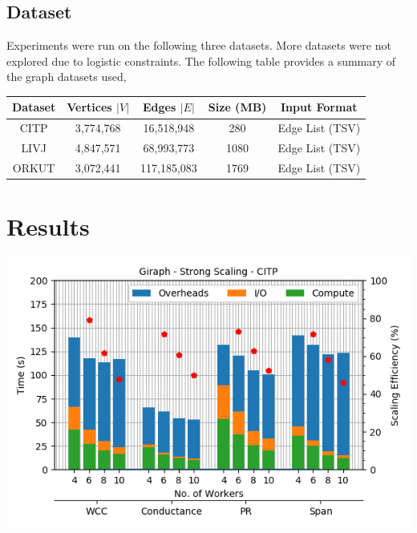 \documentclass[11pt,a4paper,oneside]{article}
\begin{document}
    \subsection{Dataset}
    Experiments were run on the following three datasets. More datasets were not explored due to logistic constraints. The following table provides a summary of the graph datasets used,
    \begin{center}
    \begin{tabular}{|c|c|c|c|c|}
    	\hline 
    	\textbf{Dataset} & \textbf{Vertices $|V|$}  & \textbf{Edges $|E|$} & \textbf{Size (MB)} & \textbf{Input Format}\\
    	\hline
    	CITP & 3,774,768 & 16,518,948 & 280 & Edge List (TSV) \\
    	\hline
    	LIVJ & 4,847,571 & 68,993,773 & 1080 & Edge List (TSV) \\
    	\hline
    	ORKUT & 3,072,441 & 117,185,083 & 1769 & Edge List (TSV)\\
    	\hline
    \end{tabular}
    \end{center}
    	
    \section{Results}
    
    \begin{center}
    	\includegraphics[scale=0.6]{1.png}		
    \end{center}
\end{document}
